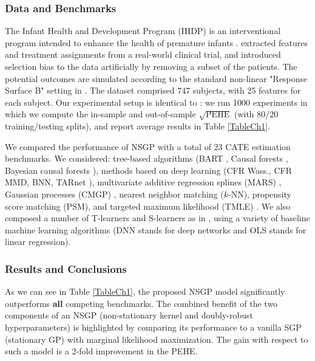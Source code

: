 \documentclass [PhD] {uclathes}
\begin{document}
\subsubsection{Data and Benchmarks}
\label{expexp0ZXC}  
The Infant Health and Development Program (IHDP) is an interventional program intended to enhance the health of premature infants \cite{hill2011bayesian}. \cite{hill2011bayesian} extracted features and treatment assignments from a real-world clinical trial, and introduced selection bias to the data artificially by removing a subset of the patients. The potential outcomes are simulated according to the standard non-linear "Response Surface B" setting in \cite{hill2011bayesian}. The dataset comprised 747 subjects, with 25 features for each subject. Our experimental setup is identical to \cite{hill2011bayesian,johansson2016learning,shalit2016estimating,alaa2017bayesian}: we run 1000 experiments in which we compute the in-sample and out-of-sample $\sqrt{\mbox{PEHE}}$ (with 80/20 training/testing splits), and report average results in Table \ref{TableCh1}. 

We compared the performance of NSGP with a total of 23 CATE estimation benchmarks. We considered: tree-based algorithms (BART \cite{hill2011bayesian}, Causal forests \cite{wager2017estimation}, Bayesian causal forests \cite{hahn2017bayesian}), methods based on deep learning (CFR Wass., CFR MMD, BNN, TARnet \cite{shalit2016estimating}), multivariate additive regression splines (MARS) \cite{powers2017some}, Gaussian processes (CMGP) \cite{alaa2017bayesian}, nearest neighbor matching ($k$-NN), propensity score matching (PSM), and targeted maximum likelihood (TMLE) \cite{porter2011relative}. We also composed a number of T-learners and S-learners as in \cite{kunzel2017meta}, using a variety of baseline machine learning algorithms (DNN stands for deep networks and OLS stands for linear regression). 

\subsubsection{Results and Conclusions}  
\label{expexpZZZ}
As we can see in Table \ref{TableCh1}, the proposed NSGP model significantly outperforms \textbf{all} competing benchmarks. The combined benefit of the two components of an NSGP (non-stationary kernel and doubly-robust hyperparameters) is highlighted by comparing its performance to a vanilla SGP (stationary GP) with marginal likelihood maximization. The gain with respect to such a model is a 2-fold improvement in the PEHE. 
\end{document}
